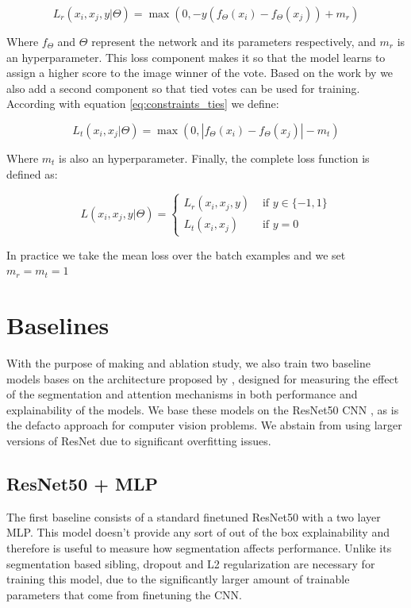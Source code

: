 \begin{equation}
	L_r(x_i,x_j,y | \Theta) = \max(0, -y(f_\Theta(x_i) - f_\Theta(x_j)) + m_r)
	\label{eq:r_loss}
\end{equation}

Where $f_\Theta$ and $\Theta$  represent the network and its parameters respectively, and $m_r$
is an hyperparameter. This loss component makes it so that the model learns to assign a higher
score to the image winner of the vote. Based on the work by  we also add a second component so that tied votes can
be used for training. According with equation \ref{eq:constraints_ties} we define:

\begin{equation}
	L_t(x_i,x_j | \Theta) = \max(0, |f_\Theta(x_i) - f_\Theta(x_j)| - m_t)
	\label{eq:t_loss}
\end{equation}

Where $m_t$ is also an hyperparameter. Finally, the complete loss function is defined as:

\begin{equation}
	L(x_i,x_j,y | \Theta) =\left\{\begin{matrix}
		L_r(x_i,x_j,y)&\text{ if } y \in \{-1,1\} \\
		L_t(x_i,x_j)&\text{ if } y=0
	\end{matrix}\right.
\end{equation}

In practice we take the mean loss over the batch examples and we set $m_r=m_t=1$

\section{Baselines}
With the purpose of making and ablation study, we also train two baseline models
bases on the architecture proposed by , designed for
measuring the effect of the segmentation and attention mechanisms in both performance
and explainability of the models. We base these models on the ResNet50 CNN \cite{he_resnet},
as is the defacto approach for computer vision problems. We abstain from using larger
versions of ResNet due to significant overfitting issues.

\subsection{ResNet50 + MLP}
The first baseline consists of a standard finetuned ResNet50 with a two layer MLP. This
model doesn't provide any sort of out of the box explainability and therefore is useful
to measure how segmentation affects performance.
Unlike its segmentation based sibling, dropout and L2 regularization are necessary for training
this model, due to the significantly larger amount of trainable parameters that come from finetuning the CNN.

